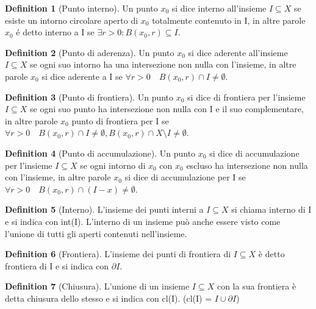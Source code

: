 \documentclass[leqno]{article}
\theoremstyle{definition}
\newtheorem{definition}{Definition}[section]
\numberwithin{equation}{section}
\theoremstyle{remark}
\begin{document}
	\begin{definition}[Punto interno]
		Un punto $x_0$ si dice interno all'insieme $I\subseteq X$ se esiste un intorno circolare aperto di $x_0$ totalmente contenuto in I, in altre parole $x_0$ é detto interno a I se  $ \exists r>0 : B(x_0,r)\subseteq I$. 
	\end{definition}
	\begin{definition}[Punto di aderenza]
		Un punto $x_0$ si dice aderente all'insieme $I\subseteq X$ se ogni suo intorno ha una intersezione non nulla con l'insieme, in altre parole $x_0$ si dice aderente a I se $\forall r > 0 \quad B(x_0,r)\cap I \neq \emptyset $.
	\end{definition}
	\begin{definition}[Punto di frontiera]
		Un punto $x_0$ si dice di frontiera per l'insieme $I\subseteq X$ se ogni suo punto ha intersezione non nulla con I e il suo complementare, in altre parole $x_0$ punto di frontiera per I se $\forall r>0 \quad B(x_0,r)\cap I \neq \emptyset, B(x_0,r)\cap X\setminus I \neq \emptyset $.
	\end{definition}
	\begin{definition}[Punto di accumulazione]
		Un punto $x_0$ si dice di accumulazione per l'insieme $I\subseteq X$ se ogni intorno di $x_0$ con $x_0$ escluso ha intersezione non  nulla con l'insieme, in altre parole $x_0$ si dice di accumulazione per I se $\forall r > 0 \quad B(x_0,r)\cap (I-x)\neq \emptyset$.
	\end{definition}
	\begin{definition}[Interno]
		L'insieme dei punti interni a $I\subseteq X$ si chiama interno di I e si indica con int(I). L'interno di un insieme può anche essere visto come l'unione di tutti gli aperti contenuti nell'insieme.
	\end{definition}
	\begin{definition}[Frontiera]
		L'insieme dei punti di frontiera di $I\subseteq X$ è detto frontiera di I e si indica con $\partial I$.
	\end{definition}
	\begin{definition}[Chiusura]
		L'unione di un insieme $I\subseteq X$ con la sua frontiera è detta chiusura dello stesso e si indica con cl(I). (cl(I) = $I \cup \partial I$) 
	\end{definition}
\end{document}
